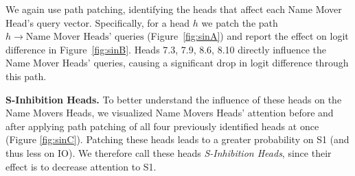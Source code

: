 We again use path patching, identifying the heads that affect each Name Mover Head's query vector. Specifically, for a head $h$ we patch the path $h \to \text{Name Mover Heads' queries}$ (Figure~\ref{fig:sinA}) and report the effect on logit difference in Figure~\ref{fig:sinB}. %
%
Heads 7.3, 7.9, 8.6, 8.10 directly influence the Name Mover Heads' queries, causing a significant drop in logit difference through this path. 

\textbf{S-Inhibition Heads.} To better understand the influence of these heads on the Name Movers Heads, we visualized Name Movers Heads' attention before and after applying path patching of all four previously identified heads at once (Figure \ref{fig:sinC}). Patching these heads leads to a greater probability on S1 (and thus less on IO). We therefore call these heads \emph{S-Inhibition Heads}, since their effect is to decrease attention to S1.


